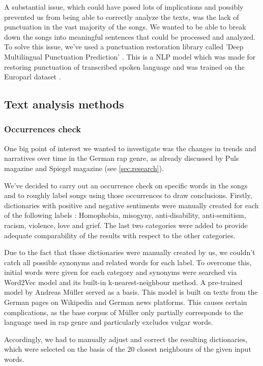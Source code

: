 A substantial issue, which could have posed lots of implications and possibly prevented us from being able to correctly analyze the texts, was the lack of punctuation in the vast majority of the songs. We wanted to be able to break down the songs into meaningful sentences that could be processed and analyzed. To solve this issue, we've used a punctuation restoration library called 'Deep Multilingual Punctuation Prediction' \cite{auto-punctuation}. This is a NLP model which was made for restoring punctuation of transcribed spoken language and was trained on the Europarl dataset \cite{europarl}.

\subsection*{Text analysis methods}

\subsubsection*{Occurrences check}

One big point of interest we wanted to investigate was the changes in trends and narratives over time in the German rap genre, as already discussed by Puls magazine and Spiegel magazine (see \autoref{sec:research}).

We've decided to carry out an occurrence check on specific words in the songs and to roughly label songs using those occurrences to draw conclusions. Firstly, dictionaries with positive and negative sentiments were manually created for each of the following labels : Homophobia, misogyny, anti-disability, anti-semitism, racism, violence, love and grief. The last two categories were added to provide adequate comparability of the results with respect to the other categories.

Due to the fact that those dictionaries were manually created by us, we couldn't catch all possible synonyms and related words for each label. To overcome this, initial words were given for each category and synonyms were searched via Word2Vec model and its built-in k-nearest-neighbour method. A pre-trained model by Andreas M{\"u}ller \cite{mueller2015} served as a basis. This model is built on texts from the German pages on Wikipedia and German news platforms. This causes certain complications, as the base corpus of M{\"u}ller only partially corresponds to the language used in rap genre and particularly excludes vulgar words.

Accordingly, we had to manually adjust and correct the resulting dictionaries, which were selected on the basis of the 20 closest neighbours of the given input words. 

